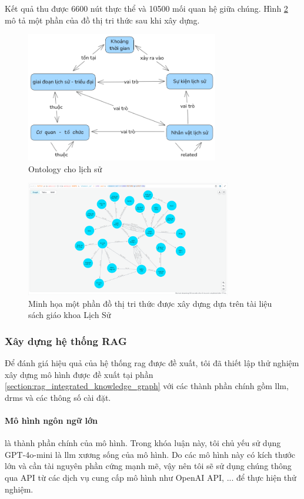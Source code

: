Kết quả thu được 6600 nút thực thể và 10500 mối quan hệ giữa chúng. Hình \ref{fig:knowledge_graph} mô tả một phần của đồ thị tri thức sau khi xây dựng.
\begin{figure}
    \centering
    \includegraphics[width=0.75\textwidth]{Chapter4/Fig/ontology.png}
    \caption{Ontology cho lịch sử}
    \label{fig:ontology}
\end{figure}
\begin{figure}
    \centering
    \includegraphics[width=0.8\textwidth, trim=320 50 320 65, clip]{Chapter4/Fig/knowledge_graph.png}
    \caption{Minh họa một phần đồ thị tri thức được xây dựng dựa trên tài liệu sách giáo khoa Lịch Sử}
    \label{fig:knowledge_graph}
\end{figure}


\subsubsection{Xây dựng hệ thống RAG}
\label{section:rag_system_construction_experiment}
Để đánh giá hiệu quả của hệ thống \gls{rag} được đề xuất, tôi đã thiết lập thử nghiệm xây dựng mô hình được đề xuất tại phần \ref{section:rag_integrated_knowledge_graph} với các thành phần chính gồm \gls{llm}, \gls{drms} và các thông số cài đặt.


\paragraph{Mô hình ngôn ngữ lớn} là thành phần chính của mô hình. Trong khóa luận này, tôi chủ yếu sử dụng GPT-4o-mini là \gls{llm} xương sống của mô hình. Do các mô hình này có kích thước lớn và cần tài nguyên phần cứng mạnh mẽ, vậy nên tôi sẽ sử dụng chúng thông qua API từ các dịch vụ cung cấp mô hình như OpenAI API, ... để thực hiện thử nghiệm.


